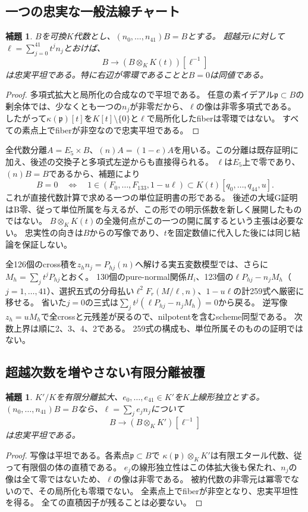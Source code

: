 \documentclass[a4paper,11pt]{ltjsarticle}
\newtheorem{lemma}[proposition]{補題}
\theoremstyle{definition}
\begin{document}
\subsection{一つの忠実な一般法線チャート}
\begin{lemma}\label{lem:faithful-chart}
\(B\)を可換\(K\)代数とし、\((n_0,\ldots,n_{41})B=B\)とする。
超越元\(t\)に対して\(\ell=\sum_{j=0}^{41}t^j n_j\)とおけば、
\[
 B\longrightarrow (B\otimes_K K(t))[\ell^{-1}]
\]
は忠実平坦である。特に右辺が零環であることと\(B=0\)は同値である。
\end{lemma}
\begin{proof}
多項式拡大と局所化の合成なので平坦である。
任意の素イデアル\(\mathfrak p\subset B\)の剰余体では、少なくとも一つの\(n_j\)が非零だから、\(\ell\)の像は非零多項式である。
したがって\(\kappa(\mathfrak p)[t]\)を\(K[t]\setminus\{0\}\)と\(\ell\)で局所化したfiberは零環ではない。
すべての素点上でfiberが非空なので忠実平坦である。
\end{proof}

全代数分離\(A=E_5\times B\)、\((n)A=(1-e)A\)を用いる。この分離は既存証明に加え、後述の交換子と多項式左逆からも直接得られる。
\(\ell\)は\(E_5\)上で零であり、\((n)B=B\)であるから、補題により
\[
 B=0\quad\Longleftrightarrow\quad
 1\in(F_0,\ldots,F_{133},1-u\ell)\subset K(t)[q_0,\ldots,q_{44},u].
\]
これが直接代数計算で求める一つの単位証明書の形である。
後述の大域G証明はB零、従って単位所属を与えるが、この形での明示係数を新しく展開したものではない。
\(B\otimes_KK(t)\)の全幾何点がこの一つの開に属するという主張は必要ない。
忠実性の向きは\(B\)からの写像であり、\(t\)を固定数値に代入した後には同じ結論を保証しない。

全126個のcross積を\(z_hn_j=P_{hj}(n)\)へ解ける実五変数模型では、さらに\(M_h=\sum_jt^jP_{hj}\)とおく。
130個のpure-normal関係\(H_i\)、123個の\(\ell P_{hj}-n_jM_h\)（\(j=1,\ldots,41\)）、選択五式の分母払い\(\ell^2 F_r(M/\ell,n)\)、\(1-u\ell\)の計259式へ厳密に移せる。
省いた\(j=0\)の三式は\(\sum_jt^j(\ell P_{hj}-n_jM_h)=0\)から戻る。
逆写像\(z_h=uM_h\)で全crossと元残差が戻るので、nilpotentを含むscheme同型である。
次数上界は順に2、3、4、2である。
259式の構成も、単位所属そのものの証明ではない。

\subsection{超越次数を増やさない有限分離被覆}
\begin{lemma}\label{lem:finite-chart}
\(K'/K\)を有限分離拡大、\(e_0,\ldots,e_{41}\in K'\)を\(K\)上線形独立とする。
\((n_0,\ldots,n_{41})B=B\)なら、\(\ell=\sum_j e_j n_j\)について
\[
 B\longrightarrow(B\otimes_KK')[\ell^{-1}]
\]
は忠実平坦である。
\end{lemma}
\begin{proof}
写像は平坦である。各素点\(\mathfrak p\subset B\)で
\(\kappa(\mathfrak p)\otimes_KK'\)は有限エタール代数、従って有限個の体の直積である。
\(e_j\)の線形独立性はこの体拡大後も保たれ、\(n_j\)の像は全て零ではないため、\(\ell\)の像は非零である。
被約代数の非零元は冪零でないので、その局所化も零環でない。
全素点上でfiberが非空となり、忠実平坦性を得る。
全ての直積因子が残ることは必要ない。
\end{proof}
\end{document}
